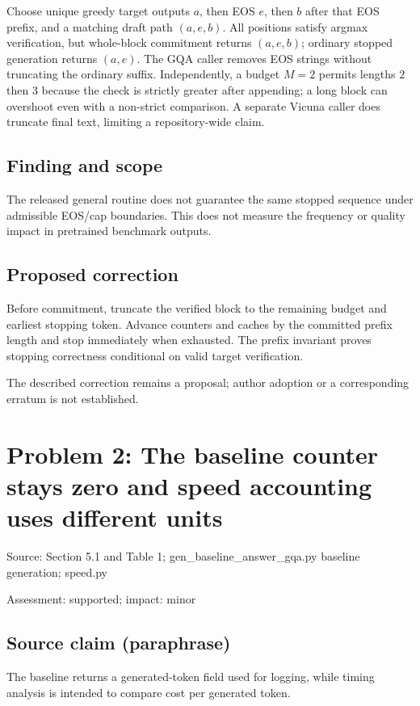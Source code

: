 \documentclass[11pt]{article}
\begin{document}
Choose unique greedy target outputs \(a\), then EOS \(e\), then \(b\) after that EOS prefix, and a matching draft path \((a,e,b)\). All positions satisfy argmax verification, but whole-block commitment returns \((a,e,b)\); ordinary stopped generation returns \((a,e)\). The GQA caller removes EOS strings without truncating the ordinary suffix. Independently, a budget \(M=2\) permits lengths \(2\) then \(3\) because the check is strictly greater after appending; a long block can overshoot even with a non-strict comparison. A separate Vicuna caller does truncate final text, limiting a repository-wide claim.

\subsection*{Finding and scope}

The released general routine does not guarantee the same stopped sequence under admissible EOS/cap boundaries. This does not measure the frequency or quality impact in pretrained benchmark outputs.

\subsection*{Proposed correction}

Before commitment, truncate the verified block to the remaining budget and earliest stopping token. Advance counters and caches by the committed prefix length and stop immediately when exhausted. The prefix invariant proves stopping correctness conditional on valid target verification.

The described correction remains a proposal; author adoption or a corresponding erratum is not established.

\section*{Problem 2: The baseline counter stays zero and speed accounting uses different units}

Source: Section 5.1 and Table 1; gen\_baseline\_answer\_gqa.py baseline generation; speed.py

Assessment: supported; impact: minor

\subsection*{Source claim (paraphrase)}

The baseline returns a generated-token field used for logging, while timing analysis is intended to compare cost per generated token.
\end{document}

